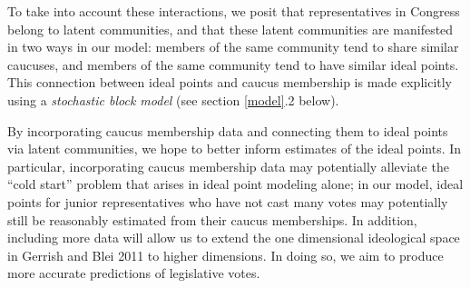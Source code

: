 \documentclass{article}
\begin{document}
To take into account these interactions, we posit that representatives in Congress belong to latent communities, and that these latent communities are manifested in two ways in our model: members of the same community tend to share similar caucuses, and members of the same community tend to have similar ideal points. This connection between ideal points and caucus membership is made explicitly using a {\itshape stochastic block model} (see section \ref{model}.2 below). \par

By incorporating caucus membership data and connecting them to ideal points via latent communities, we hope to better inform estimates of the ideal points. { \color{red} In particular, incorporating caucus membership data may potentially alleviate the ``cold start'' problem that arises in ideal point modeling alone; in our model, ideal points for junior representatives who have not cast many votes may potentially still be reasonably estimated from their caucus memberships.} In addition, including more data will allow us to extend the one dimensional ideological space in Gerrish and Blei 2011 to higher dimensions. {\color{red} In doing so, we aim to produce more accurate predictions of legislative votes. }
\end{document}

